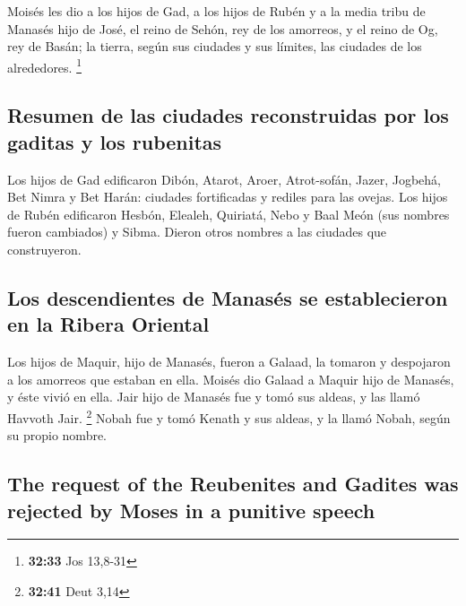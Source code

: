 \begin{paracol}{2}
 Moisés les dio a los hijos de Gad, a los hijos de Rubén
y a la media tribu de Manasés hijo de José, el reino de Sehón, rey de
los amorreos, y el reino de Og, rey de Basán; la tierra, según sus
ciudades y sus límites, las ciudades de los alrededores. \footnote{\textbf{32:33}
  Jos 13,8-31}

\hypertarget{resumen-de-las-ciudades-reconstruidas-por-los-gaditas-y-los-rubenitas}{%
\subsection{Resumen de las ciudades reconstruidas por los gaditas y los
rubenitas}\label{resumen-de-las-ciudades-reconstruidas-por-los-gaditas-y-los-rubenitas}}

 Los hijos de Gad edificaron Dibón, Atarot, Aroer,
 Atrot-sofán, Jazer, Jogbehá,  Bet Nimra y
Bet Harán: ciudades fortificadas y rediles para las ovejas.
 Los hijos de Rubén edificaron Hesbón, Elealeh, Quiriatá,
 Nebo y Baal Meón (sus nombres fueron cambiados) y Sibma.
Dieron otros nombres a las ciudades que construyeron.

\hypertarget{los-descendientes-de-manasuxe9s-se-establecieron-en-la-ribera-oriental}{%
\subsection{Los descendientes de Manasés se establecieron en la Ribera
Oriental}\label{los-descendientes-de-manasuxe9s-se-establecieron-en-la-ribera-oriental}}

 Los hijos de Maquir, hijo de Manasés, fueron a Galaad,
la tomaron y despojaron a los amorreos que estaban en ella.
 Moisés dio Galaad a Maquir hijo de Manasés, y éste vivió
en ella.  Jair hijo de Manasés fue y tomó sus aldeas, y
las llamó Havvoth Jair. \footnote{\textbf{32:41} Deut 3,14}
 Nobah fue y tomó Kenath y sus aldeas, y la llamó Nobah,
según su propio nombre.

\switchcolumn
\begin{otherlanguage}{english}

\hypertarget{the-request-of-the-reubenites-and-gadites-was-rejected-by-moses-in-a-punitive-speech}{%
\subsection{The request of the Reubenites and Gadites was rejected by
Moses in a punitive
speech}\label{the-request-of-the-reubenites-and-gadites-was-rejected-by-moses-in-a-punitive-speech}}


\end{otherlanguage}
\end{paracol}
